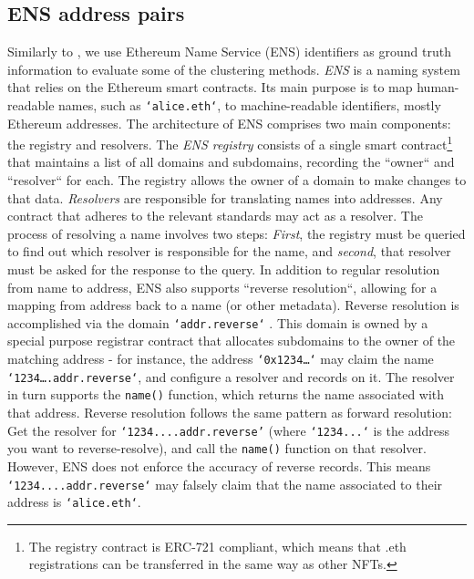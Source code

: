 \documentclass[12pt,a4paper,titlepage,oneside,english]{article}
\begin{document}
\subsection{ENS address pairs}
\label{sec:ens}
Similarly to \cite{Beres2020}, we use Ethereum Name Service (ENS) identifiers as ground truth information to evaluate some of the clustering methods.\newline
\textit{ENS} is a naming system that relies on the Ethereum smart contracts. Its main purpose is to map human-readable names, such as \texttt{`alice.eth`}, to machine-readable identifiers, mostly Ethereum addresses. The architecture of ENS comprises two main components: the registry and resolvers. \newline
The \textit{ENS registry} consists of a single smart contract\footnote{The registry contract is ERC-721 compliant, which means that .eth registrations can be transferred in the same way as other NFTs.} that maintains a list of all domains and subdomains, recording the ``owner`` and ``resolver`` for each. The registry allows the owner of a domain to make changes to that data. \citep{ENSdocs} %
\newline
\textit{Resolvers} are responsible for %
 translating names into addresses. Any contract that adheres to the relevant standards may act as a resolver. The process of resolving a name involves two steps: \textit{First}, the registry must be queried to find out which resolver is responsible for the name, and \textit{second}, that resolver must be asked for the response to the query. \newline
In addition to regular resolution from name to address, ENS also supports ``reverse resolution``, allowing for a mapping from address back to a name (or other metadata). Reverse resolution is accomplished via the %
 domain \texttt{`addr.reverse`}%
. This domain is owned by a special purpose registrar contract that allocates subdomains to the owner of the matching address - for instance, the address \texttt{`0x1234\dots`} may claim the name \texttt{`1234\dots.addr.reverse`}, and configure a resolver and records on it. The resolver in turn supports the \texttt{name()} function, which returns the name associated with that address.\newline
 Reverse resolution %
 follows the same pattern as forward resolution: Get the resolver for \texttt{`1234....addr.reverse'} (where \texttt{`1234...`} is the address you want to reverse-resolve), and call the \texttt{name()} function on that resolver. However, ENS does not enforce the accuracy of reverse records. This means \texttt{`1234....addr.reverse`} may falsely claim that the name associated to their address is \texttt{`alice.eth`}. 
 
\end{document}
